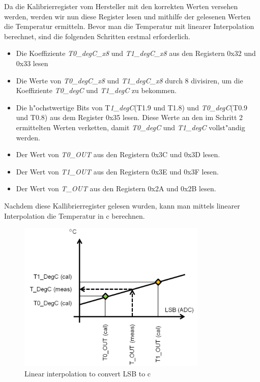 Da die Kalibrierregister vom Hersteller mit den korrekten Werten versehen werden, werden wir nun diese Register lesen und mithilfe der gelesenen Werten die Temperatur ermitteln. Bevor man die Temperatur mit linearer Interpolation berechnet, sind die folgenden Schritten erstmal erforderlich.

\begin{itemize}
	\item Die Koeffiziente \textit{T0\_degC\_x8} und \textit{T1\_degC\_x8} aus den Registern 0x32 und 0x33 lesen
	\item Die Werte von \textit{T0\_degC\_x8} und \textit{T1\_degC\_x8} durch 8 divisiren, um die Koeffiziente \textit{T0\_degC} und \textit{T1\_degC} zu bekommen.
	\item Die h"ochstwertige Bits von T\textit{1\_degC}(T1.9 und T1.8) und \textit{T0\_degC}(T0.9 und T0.8) aus dem Register 0x35 lesen. Diese Werte an den im Schritt 2 ermittelten Werten verketten, damit \textit{T0\_degC} und \textit{T1\_degC} vollst"andig werden.
	\item Der Wert von \textit{T0\_OUT} aus den Registern 0x3C und 0x3D lesen.
	\item Der Wert von \textit{T1\_OUT} aus den Registern 0x3E und 0x3F lesen.
	\item Der Wert von \textit{T\_OUT} aus den Registern 0x2A und 0x2B lesen.
	 	
\end{itemize}

Nachdem diese Kallibrierregister gelesen wurden, kann man mittels linearer Interpolation die Temperatur in \textdegree{}c berechnen.

\begin{figure}[h]
	\centering
	\includegraphics[width=9cm]{source/images/Temp}
	\caption{Linear interpolation to convert LSB to \textdegree{}c \cite{HTS221}}\label{fig:T}
\end{figure}

